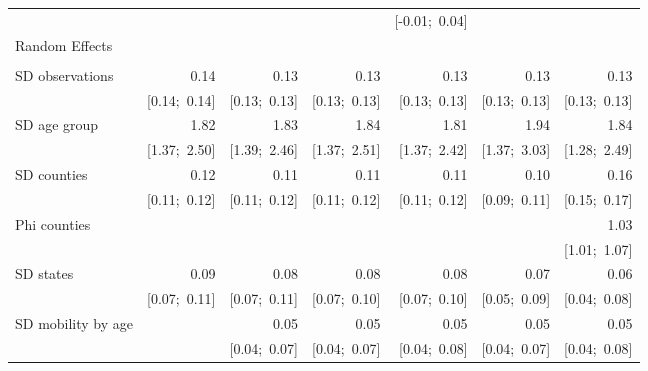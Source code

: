 \begin{sidewaystable}[htp]
\begin{center}
{\begin{tabular}{l D{.}{.}{6.11} D{.}{.}{6.11} D{.}{.}{6.11} D{.}{.}{6.11} D{.}{.}{6.11} D{.}{.}{6.11} }
                               &                 &                 &                 & [-0.01;\ 0.04]  &                 &                 \\
Random Effects                 &                 &                 &                 &                 &                 &                 \\
                               &                 &                 &                 &                 &                 &                 \\
\quad SD observations          & 0.14            & 0.13            & 0.13            & 0.13            & 0.13            & 0.13            \\
                               & [0.14;\ 0.14]   & [0.13;\ 0.13]   & [0.13;\ 0.13]   & [0.13;\ 0.13]   & [0.13;\ 0.13]   & [0.13;\ 0.13]   \\
\quad SD age group             & 1.82            & 1.83            & 1.84            & 1.81            & 1.94            & 1.84            \\
                               & [1.37;\ 2.50]   & [1.39;\ 2.46]   & [1.37;\ 2.51]   & [1.37;\ 2.42]   & [1.37;\ 3.03]   & [1.28;\ 2.49]   \\
\quad SD counties              & 0.12            & 0.11            & 0.11            & 0.11            & 0.10            & 0.16            \\
                               & [0.11;\ 0.12]   & [0.11;\ 0.12]   & [0.11;\ 0.12]   & [0.11;\ 0.12]   & [0.09;\ 0.11]   & [0.15;\ 0.17]   \\
\quad Phi counties             &                 &                 &                 &                 &                 & 1.03            \\
                               &                 &                 &                 &                 &                 & [1.01;\ 1.07]   \\
\quad SD states                & 0.09            & 0.08            & 0.08            & 0.08            & 0.07            & 0.06            \\
                               & [0.07;\ 0.11]   & [0.07;\ 0.11]   & [0.07;\ 0.10]   & [0.07;\ 0.10]   & [0.05;\ 0.09]   & [0.04;\ 0.08]   \\
\quad SD mobility by age       &                 & 0.05            & 0.05            & 0.05            & 0.05            & 0.05            \\
                               &                 & [0.04;\ 0.07]   & [0.04;\ 0.07]   & [0.04;\ 0.08]   & [0.04;\ 0.07]   & [0.04;\ 0.08]   \\

\end{tabular}}
\end{center}
\end{sidewaystable}
